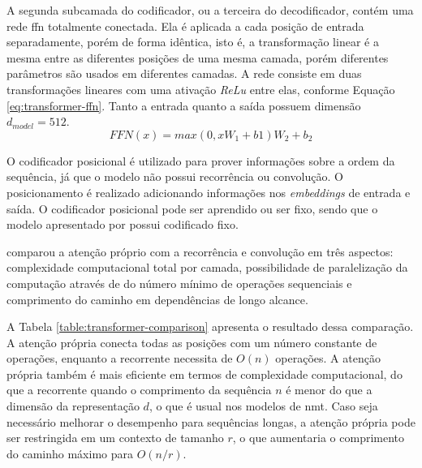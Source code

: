 A segunda subcamada do codificador, ou a terceira do decodificador, contém uma rede \gls{ffn} totalmente conectada. Ela é aplicada a cada posição de entrada separadamente, porém de forma idêntica, isto é, a transformação linear é a mesma entre as diferentes posições de uma mesma camada, porém diferentes parâmetros são usados em diferentes camadas. A rede consiste em duas transformações lineares com uma ativação \textit{ReLu} entre elas, conforme Equação \ref{eq:transformer-ffn}. Tanto a entrada quanto a saída possuem dimensão $d_{model} = 512$.
\begin{equation}
    \label{eq:transformer-ffn}
    FFN(x) = max(0, xW_1 + b1)W_2 + b_2
\end{equation}

O codificador posicional é utilizado para prover informações sobre a ordem da sequência, já que o modelo não possui recorrência ou convolução. O posicionamento é realizado adicionando informações nos \textit{embeddings} de entrada e saída. O codificador posicional pode ser aprendido ou ser fixo, sendo que o modelo apresentado por \textcite{Vaswani2017Attention} possui codificado fixo.

\textcite{Vaswani2017Attention} comparou a atenção próprio com a recorrência e convolução em três aspectos: complexidade computacional total por camada, possibilidade de paralelização da computação através de do número mínimo de operações sequenciais e comprimento do caminho em dependências de longo alcance.

A Tabela \ref{table:transformer-comparison} apresenta o resultado dessa comparação. A atenção própria conecta todas as posições com um número constante de operações, enquanto a recorrente necessita de $O(n)$ operações. A atenção própria também é mais eficiente em termos de complexidade computacional, do que a recorrente quando o comprimento da sequência $n$ é menor do que a dimensão da representação $d$, o que é usual nos modelos de \gls{nmt}. Caso seja necessário melhorar o desempenho para sequências longas, a atenção própria pode ser restringida em um contexto de tamanho $r$, o que aumentaria o comprimento do caminho máximo para $O(n/r)$.

